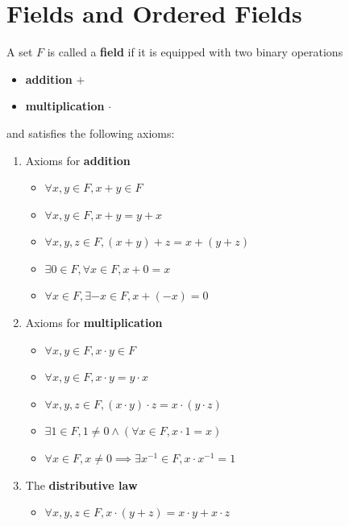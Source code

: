 \section{Fields and Ordered Fields}

A set $F$ is called a \textbf{field} if it is equipped with two binary operations
\begin{itemize}
    \item \textbf{addition} $+$
    \item \textbf{multiplication} $\cdot$
\end{itemize}
and satisfies the following axioms:
\begin{enumerate}[label=\textbf{(\Alph*)}]
    \item Axioms for \textbf{addition}
    \begin{itemize}
        \item $\forall x, y \in F, x + y \in F$
        \item $\forall x, y \in F, x + y = y + x$
        \item $\forall x, y, z \in F, (x + y) + z = x + (y + z)$
        \item $\exists 0 \in F, \forall x \in F, x + 0 = x$
        \item $\forall x \in F, \exists -x \in F, x + (-x) = 0$
    \end{itemize}
    \item Axioms for \textbf{multiplication}
    \begin{itemize}
        \item $\forall x, y \in F, x \cdot y \in F$
        \item $\forall x, y \in F, x \cdot y = y \cdot x$
        \item $\forall x, y, z \in F, (x \cdot y) \cdot z = x \cdot (y \cdot z)$
        \item $\exists 1 \in F, 1 \neq 0 \land (\forall x \in F, x \cdot 1 = x)$
        \item $\forall x \in F, x \neq 0 \implies \exists x^{-1} \in F, x \cdot x^{-1} = 1$
    \end{itemize}
    \item The \textbf{distributive law}
    \begin{itemize}
        \item $\forall x, y, z \in F, x \cdot (y + z) = x \cdot y + x \cdot z$
    \end{itemize}
\end{enumerate}

\bigskip

